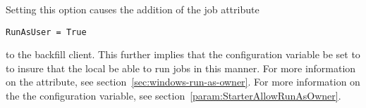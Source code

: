 \begin{enumerate}
Setting this option causes the addition of the job attribute
\begin{verbatim}
RunAsUser = True
\end{verbatim}
to the backfill client.
This further implies that the configuration variable
 be set to 
to insure that the local  be able to run jobs in this 
manner.
For more information on the  attribute, 
see section~\ref{sec:windows-run-as-owner}. 
For more information on the the  
configuration variable, see 
section~\ref{param:StarterAllowRunAsOwner}.

\end{enumerate}
